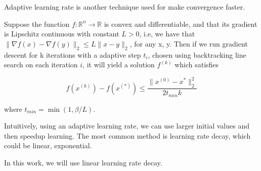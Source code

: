 Adaptive learning rate is another technique used for make convergence faster.


\begin{gdconv}
	Suppose the function $f : \mathbb{R}^{n} \rightarrow \mathbb{R}$ is convex and differentiable, and that its gradient is Lipschitz continuous with constant $L > 0$, i.e, we have that $\lVert \nabla f(x) - \nabla f(y) \rVert_{2} \leq L\lVert x - y \rVert_{2}$, for any x, y. Then if we run gradient descent for k iterations with a adaptive step $t_{i}$, chosen using backtracking line search on each iteration $i$, it will yield a solution $f^{(k)}$ which satisfies
	
	\begin{equation}
	f(x^{(k)}) - f(x^{(*)}) \leq \frac{\lVert x^{(0)} - x^{*} \rVert^{2}_{2}}{2t_{min}k} 
	\end{equation}
	
	where $t_{min} = \min({1, \beta / L})$.
\end{gdconv}


Intuitively, using an adaptive learning rate, we can use larger initial values and then speedup learning. The most common method is learning rate decay, which could be linear, exponential.

In this work, we will use linear learning rate decay.